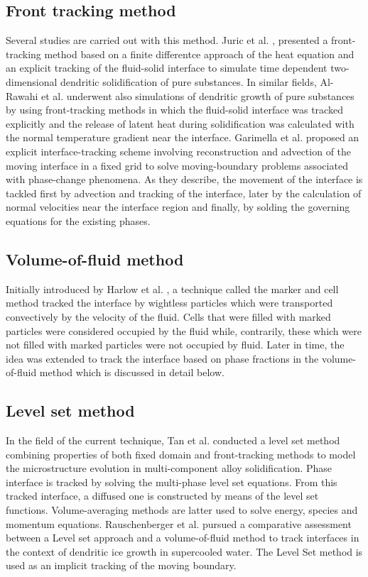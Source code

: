 \subsection{Front tracking method}
Several studies are carried out with this method. Juric et al. \cite{juric_tryggvason_1996}, presented a front-tracking method based on a finite differentce approach of the heat equation and an explicit tracking of the fluid-solid interface to simulate time dependent two-dimensional dendritic solidification of pure substances. In similar fields, Al-Rawahi et al. \cite{al-rawahi_tryggvason_2002} underwent also simulations of dendritic growth of pure substances by using front-tracking methods in which the fluid-solid interface was tracked explicitly and the release of latent heat during solidification was calculated with the normal temperature gradient near the interface. Garimella et al. \cite{li_garimella_simpson_2003} proposed an explicit interface-tracking scheme involving reconstruction and advection of the moving interface in a fixed grid to solve moving-boundary problems associated with phase-change phenomena. As they describe, the movement of the interface is tackled first by advection and tracking of the interface, later by the calculation of normal velocities near the interface region and finally, by solding the governing equations for the existing phases.
\subsection*{Volume-of-fluid method}
Initially introduced by Harlow et al. \cite{harlow_welch_1965}, a technique called the marker and cell method tracked the interface by wightless particles which were transported convectively by the velocity of the fluid. Cells that were filled with marked particles were considered occupied by the fluid while, contrarily, these which were not filled with marked particles were not occupied by fluid. Later in time, the idea was extended to track the interface based on phase fractions in the volume-of-fluid method which is discussed in detail below.
\subsection*{Level set method}
In the field of the current technique, Tan et al. \cite{tan_zabaras_2007} conducted a level set method combining properties of both fixed domain and front-tracking methods to model the microstructure evolution in multi-component alloy solidification. Phase interface is tracked by solving the multi-phase level set equations. From this tracked interface, a diffused one is constructed by means of the level set functions. Volume-averaging methods are latter used to solve energy, species and momentum equations.  Rauschenberger et al. \cite{rauschenberger_criscione_eisenschmidt_kintea_jakirlic_tukovic_roisman_weigand_tropea_2013} pursued a comparative assessment between a Level set approach and a volume-of-fluid method to track interfaces in the context of dendritic ice growth in supercooled water. The Level Set method is used as an implicit tracking of the moving boundary.
